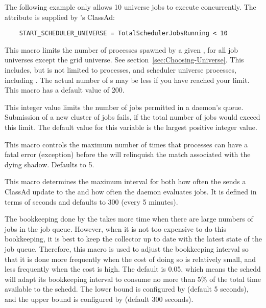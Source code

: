 \begin{description}
  The following example only allows 10  universe jobs to
  execute concurrently. The attribute 
  is supplied by 's ClassAd:
  
  \footnotesize
  \begin{verbatim}
    START_SCHEDULER_UNIVERSE = TotalSchedulerJobsRunning < 10
  \end{verbatim}
  \normalsize
  
  
\item[\Macro{MAX\_JOBS\_RUNNING}] \label{param:MaxJobsRunning} This
  macro limits the number of processes spawned by a given
  , for all job universes except the 
  grid universe.  See section~\ref{sec:Choosing-Universe}.
  This includes, but is not limited to  processes,
  and scheduler universe processes, including .
  The actual
  number of s may be less if you have reached
  your  limit.
  This macro has a default value of 200.

\item[\Macro{MAX\_JOBS\_SUBMITTED}] \label{param:MaxJobsSubmitted}
  This integer value limits the number of jobs permitted in 
  a  daemon's queue. Submission of a new cluster
  of jobs fails, if the total number of jobs would exceed this limit. 
  The default value for this variable is the largest positive
  integer value.

\item[\Macro{MAX\_SHADOW\_EXCEPTIONS}]
  \label{param:MaxShadowExceptions} This macro controls the maximum
  number of times that  processes can have a fatal
  error (exception) before the  will relinquish
  the match associated with the dying shadow.  Defaults to 5.

\item[\Macro{SCHEDD\_INTERVAL}] \label{param:ScheddInterval} This
  macro determines the maximum interval for both how often the
   sends a ClassAd update to the  and
  how often the  daemon evaluates jobs.  It is defined
  in terms of seconds and defaults to 300 (every 5 minutes).

\item[\Macro{SCHEDD\_INTERVAL\_TIMESLICE}]
\label{param:ScheddIntervalTimeslice} The bookkeeping done by the
 takes more time when there are large numbers of jobs
in the job queue.  However, when it is not too expensive to do this
bookkeeping, it is best to keep the collector up to date with the
latest state of the job queue.  Therefore, this macro is used to
adjust the bookkeeping interval so that it is done more frequently
when the cost of doing so is relatively small, and less frequently
when the cost is high.  The default is 0.05, which means the schedd
will adapt its bookkeeping interval to consume no more than 5\% of the
total time available to the schedd.  The lower bound is configured by
 (default 5 seconds), and the upper bound
is configured by  (default 300 seconds).



\end{description}
